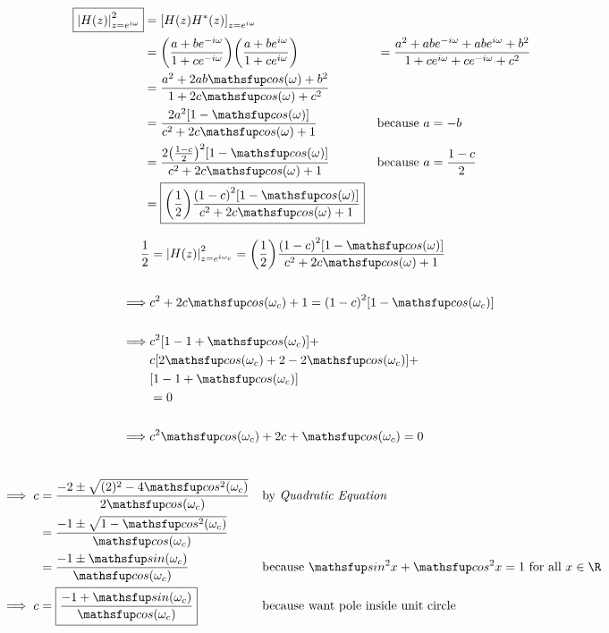 \begin{align*}
  \boxed{\abs{H(z)}^2_{z=e^{i\omega}}}
    &= \brs{H(z)H^\ast(z)}_{z=e^{i\omega}}
  \\&= \brp{\frac{a + be^{-i\omega}}{1 + ce^{-i\omega}}}
       \brp{\frac{a + be^{i\omega}}{1 + ce^{i\omega}}}
   &&= \frac{a^2 + abe^{-i\omega} + abe^{i\omega} + b^2}
            {1   +  ce^{i\omega} +  ce^{-i\omega} + c^2}
  \\&= \frac{a^2 + 2ab\cos\brp{\omega} + b^2}
            {1   + 2 c\cos\brp{\omega} + c^2}
  \\&= \frac{2a^2\brs{1 -  \cos\brp{\omega}}}
            {c^2 + 2 c\cos\brp{\omega} + 1}
    && \text{because $a=-b$}
  \\&= \frac{2\brp{\frac{1-c}{2}}^2\brs{1 -  \cos\brp{\omega}}}
            {c^2 + 2 c\cos\brp{\omega} + 1}
    && \text{because $a=\frac{1-c}{2}$}
  \\&= \boxed{\brp{\frac{1}{2}}
              \frac{\brp{1-c}^2\brs{1 -  \cos\brp{\omega}}}
                   {c^2 + 2 c\cos\brp{\omega} + 1}
             }
\end{align*}
\mbox{}\vfill

\newpage\mbox{}\vfill
{\begin{align*}
  \frac{1}{2}
    &= \abs{H(z)}^2_{z=e^{i\omega_c}}
     = \brp{\frac{1}{2}}
       \frac{\brp{1-c}^2\brs{1 -  \cos\brp{\omega}}}
            {c^2 + 2 c\cos\brp{\omega} + 1}
  \\\\\implies &c^2 + 2 c\cos\brp{\omega_c} + 1 
             = \brp{1-c}^2\brs{1 -  \cos\brp{\omega_c}}
  \\\\\implies & c^2\brs{1-1+\cos\brp{\omega_c}} + 
             \\& c  \brs{2\cos\brp{\omega_c}+2-2\cos\brp{\omega_c}} +
             \\&    \brs{1-1+\cos\brp{\omega_c}}
             \\&= 0
  \\\\\implies & c^2{\cos\brp{\omega_c}} 
             + 2c 
             +    \cos\brp{\omega_c}
             = 0
\end{align*}}
\vfill\mbox{}

\newpage\mbox{}\vfill
{\begin{align*}
  \\\implies c &= \frac{-2 \pm \sqrt{(2)^2 -4\cos^2\brp{\omega_c}}}
                       {2\cos\brp{\omega_c}}
               && \text{by \thme{Quadratic Equation}}
             \\&= \frac{-1 \pm \sqrt{1 -\cos^2\brp{\omega_c}}}
                       {\cos\brp{\omega_c}}
             \\&= \frac{-1 \pm \sin\brp{\omega_c}}
                       {\cos\brp{\omega_c}}
               && \text{because $\sin^2x + \cos^2x = 1$ for all $x\in\R$}
  \\\implies c &=
      \boxed{\frac{-1 + \sin\brp{\omega_c}}
                    {\cos\brp{\omega_c}}}
               && \text{because want pole inside unit circle}
\end{align*}}
\vfill\mbox{}

